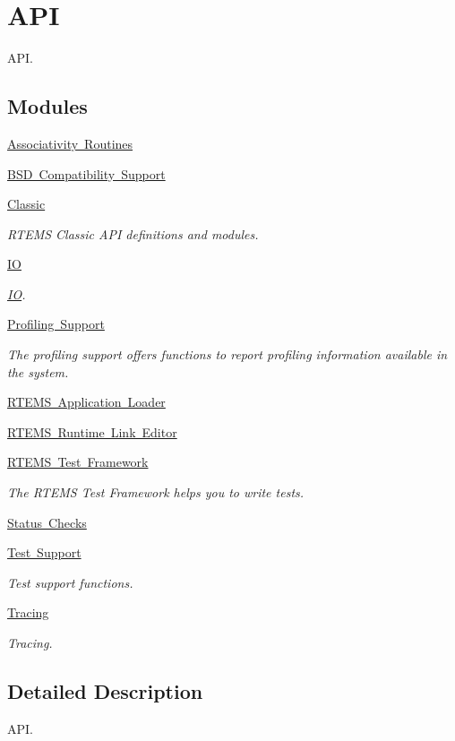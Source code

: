 \hypertarget{group__RTEMSAPI}{}\section{A\+PI}
\label{group__RTEMSAPI}


A\+PI.  


\subsection*{Modules}
\begin{DoxyCompactItemize}
\item 
\mbox{\hyperlink{group__RTEMSAPIAssociativity}{Associativity Routines}}
\item 
\mbox{\hyperlink{group__RTEMSAPIBSD}{B\+S\+D Compatibility Support}}
\item 
\mbox{\hyperlink{group__RTEMSAPIClassic}{Classic}}
\begin{DoxyCompactList}\small\item\em R\+T\+E\+MS Classic A\+PI definitions and modules. \end{DoxyCompactList}\item 
\mbox{\hyperlink{group__RTEMSAPIIO}{IO}}
\begin{DoxyCompactList}\small\item\em \mbox{\hyperlink{structIO}{IO}}. \end{DoxyCompactList}\item 
\mbox{\hyperlink{group__Profiling}{Profiling Support}}
\begin{DoxyCompactList}\small\item\em The profiling support offers functions to report profiling information available in the system. \end{DoxyCompactList}\item 
\mbox{\hyperlink{group__rtems__rap}{R\+T\+E\+M\+S Application Loader}}
\item 
\mbox{\hyperlink{group__rtems__rtl}{R\+T\+E\+M\+S Runtime Link Editor}}
\item 
\mbox{\hyperlink{group__RTEMSTestFramework}{R\+T\+E\+M\+S Test Framework}}
\begin{DoxyCompactList}\small\item\em The R\+T\+E\+MS Test Framework helps you to write tests. \end{DoxyCompactList}\item 
\mbox{\hyperlink{group__rtems__status__checks}{Status Checks}}
\item 
\mbox{\hyperlink{group__RTEMSTest}{Test Support}}
\begin{DoxyCompactList}\small\item\em Test support functions. \end{DoxyCompactList}\item 
\mbox{\hyperlink{group__RTEMSAPITracing}{Tracing}}
\begin{DoxyCompactList}\small\item\em Tracing. \end{DoxyCompactList}\end{DoxyCompactItemize}


\subsection{Detailed Description}
A\+PI. 

